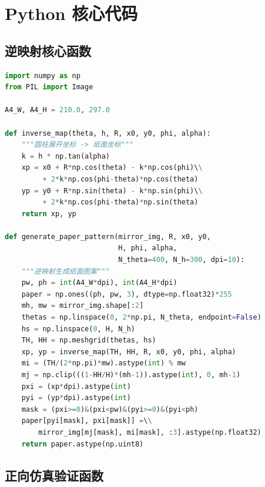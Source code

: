 \section{Python 核心代码}

\subsection{逆映射核心函数}

\begin{lstlisting}[language=Python,caption={圆柱镜反射逆映射函数}]
import numpy as np
from PIL import Image

A4_W, A4_H = 210.0, 297.0

def inverse_map(theta, h, R, x0, y0, phi, alpha):
    """圆柱展开坐标 -> 纸面坐标"""
    k = h * np.tan(alpha)
    xp = x0 + R*np.cos(theta) - k*np.cos(phi)\\
         + 2*k*np.cos(phi-theta)*np.cos(theta)
    yp = y0 + R*np.sin(theta) - k*np.sin(phi)\\
         + 2*k*np.cos(phi-theta)*np.sin(theta)
    return xp, yp

def generate_paper_pattern(mirror_img, R, x0, y0,
                           H, phi, alpha,
                           N_theta=400, N_h=300, dpi=10):
    """逆映射生成纸面图案"""
    pw, ph = int(A4_W*dpi), int(A4_H*dpi)
    paper = np.ones((ph, pw, 3), dtype=np.float32)*255
    mh, mw = mirror_img.shape[:2]
    thetas = np.linspace(0, 2*np.pi, N_theta, endpoint=False)
    hs = np.linspace(0, H, N_h)
    TH, HH = np.meshgrid(thetas, hs)
    xp, yp = inverse_map(TH, HH, R, x0, y0, phi, alpha)
    mi = (TH/(2*np.pi)*mw).astype(int) % mw
    mj = np.clip(((1-HH/H)*(mh-1)).astype(int), 0, mh-1)
    pxi = (xp*dpi).astype(int)
    pyi = (yp*dpi).astype(int)
    mask = (pxi>=0)&(pxi<pw)&(pyi>=0)&(pyi<ph)
    paper[pyi[mask], pxi[mask]] =\\
        mirror_img[mj[mask], mi[mask], :3].astype(np.float32)
    return paper.astype(np.uint8)
\end{lstlisting}

\subsection{正向仿真验证函数}

